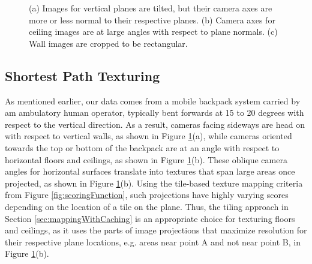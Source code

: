 \documentclass{llncs}
\begin{document}
\begin{figure}
  \centering
  \hspace{0.4in} \centering
  \centering \hspace{0.4in}
  \caption{(a) Images for vertical planes are tilted, but their camera
    axes are more or less normal to their respective planes. (b)
    Camera axes for ceiling images are at large angles with respect to
    plane normals. (c) Wall images are cropped to be rectangular.}
  \label{fig:projectionAngles}
\end{figure}

\subsection{Shortest Path Texturing}
\label{sec:shortestPath}

As mentioned earlier, our data comes from a mobile backpack system
carried by am ambulatory human operator, typically bent forwards at 15
to 20 degrees with respect to the vertical direction. As a result,
cameras facing sideways are head on with respect to vertical walls, as
shown in Figure \ref{fig:projectionAngles}(a), while cameras oriented
towards the top or bottom of the backpack are at an angle with respect
to horizontal floors and ceilings, as shown in Figure
\ref{fig:projectionAngles}(b). These oblique camera angles for
horizontal surfaces translate into textures that span large areas once
projected, as shown in Figure \ref{fig:projectionAngles}(b). Using the
tile-based texture mapping criteria from Figure
\ref{fig:scoringFunction}, such projections have highly varying scores
depending on the location of a tile on the plane. Thus, the tiling
approach in Section \ref{sec:mappingWithCaching} is an appropriate
choice for texturing floors and ceilings, as it uses the parts of
image projections that maximize resolution for their respective plane
locations, e.g. areas near point A and not near point B, in Figure
\ref{fig:projectionAngles}(b).
\end{document}
